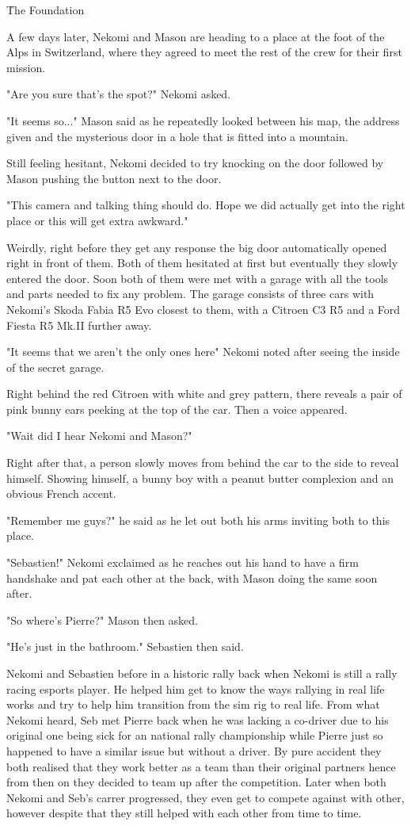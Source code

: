 \h{The Foundation}

A few days later, Nekomi and Mason are heading to a place at the foot of the Alps in Switzerland, where they agreed to meet the rest of the crew for their first mission. 

"Are you sure that's the spot?" Nekomi asked. 

"It seems so..." Mason said as he repeatedly looked between his map, the address given and the mysterious door in a hole that is fitted into a mountain. 

Still feeling hesitant, Nekomi decided to try knocking on the door followed by Mason pushing the button next to the door. 

"This camera and talking thing should do. Hope we did actually get into the right place or this will get extra awkward."

Weirdly, right before they get any response the big door automatically opened right in front of them. 
Both of them hesitated at first but eventually they slowly entered the door. 
Soon both of them were met with a garage with all the tools and parts needed to fix any problem. 
The garage consists of three cars with Nekomi's Skoda Fabia R5 Evo closest to them,  with a Citroen C3 R5 and a Ford Fiesta R5 Mk.II further away.

"It seems that we aren't the only ones here" Nekomi noted after seeing the inside of the secret garage. 

Right behind the red Citroen with white and grey pattern, there reveals a pair of pink bunny ears peeking at the top of the car. Then a voice appeared. 

"Wait did I hear Nekomi and Mason?" 

Right after that, a person slowly moves from behind the car to the side to reveal himself. 
Showing himself, a bunny boy with a peanut butter complexion and an obvious French accent. 

"Remember me guys?" he said as he let out both his arms inviting both to this place. 

"Sebastien!" Nekomi exclaimed as he reaches out his hand to have a firm handshake and pat each other at the back, with Mason doing the same soon after. 

"So where's Pierre?" Mason then asked. 

"He's just in the bathroom." Sebastien then said. 

Nekomi and Sebastien before in a historic rally back when Nekomi is still a rally racing esports player. He helped him get to know the ways rallying in real life works and try to help him transition from the sim rig to real life. 
From what Nekomi heard, Seb met Pierre back when he was lacking a co-driver due to his original one being sick for an national rally championship while Pierre just so happened to have a similar issue but without a driver. 
By pure accident they both realised that they work better as a team than their original partners hence from then on they decided to team up after the competition. 
Later when both Nekomi and Seb's carrer progressed, they even get to compete against with other, however despite that they still helped with each other from time to time. 

